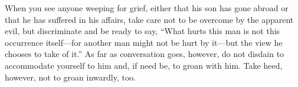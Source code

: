 When you see anyone  weeping for grief, either that his son  has gone abroad or
that  he has  suffered in  his affairs,  take care  not to  be overcome  by the
apparent evil, but discriminate  and be ready to say, ``What  hurts this man is
not this occurrence itself---for another man  might not be hurt by it---but the
view he chooses to  take of it.'' As far as conversation  goes, however, do not
disdain to accommodate yourself to him and, if need be, to groan with him. Take
heed, however, not to groan inwardly, too.
